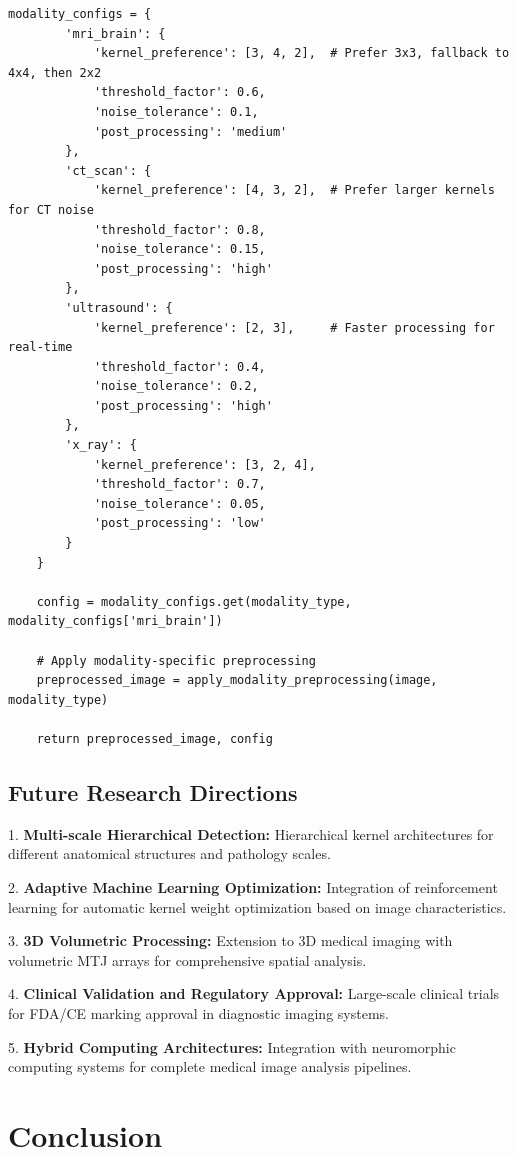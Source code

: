 \documentclass[conference]{IEEEtran}
\begin{document}
{{{{{{{{{{\begin{lstlisting}[caption={Multi-modal adaptation implementation}]
    modality_configs = {
        'mri_brain': {
            'kernel_preference': [3, 4, 2],  # Prefer 3x3, fallback to 4x4, then 2x2
            'threshold_factor': 0.6,
            'noise_tolerance': 0.1,
            'post_processing': 'medium'
        },
        'ct_scan': {
            'kernel_preference': [4, 3, 2],  # Prefer larger kernels for CT noise
            'threshold_factor': 0.8,
            'noise_tolerance': 0.15,
            'post_processing': 'high'
        },
        'ultrasound': {
            'kernel_preference': [2, 3],     # Faster processing for real-time
            'threshold_factor': 0.4,
            'noise_tolerance': 0.2,
            'post_processing': 'high'
        },
        'x_ray': {
            'kernel_preference': [3, 2, 4],
            'threshold_factor': 0.7,
            'noise_tolerance': 0.05,
            'post_processing': 'low'
        }
    }
    
    config = modality_configs.get(modality_type, modality_configs['mri_brain'])
    
    # Apply modality-specific preprocessing
    preprocessed_image = apply_modality_preprocessing(image, modality_type)
    
    return preprocessed_image, config
\end{lstlisting}

\subsection{Future Research Directions}

1. \textbf{Multi-scale Hierarchical Detection:} Hierarchical kernel architectures for different anatomical structures and pathology scales.

2. \textbf{Adaptive Machine Learning Optimization:} Integration of reinforcement learning for automatic kernel weight optimization based on image characteristics.

3. \textbf{3D Volumetric Processing:} Extension to 3D medical imaging with volumetric MTJ arrays for comprehensive spatial analysis.

4. \textbf{Clinical Validation and Regulatory Approval:} Large-scale clinical trials for FDA/CE marking approval in diagnostic imaging systems.

5. \textbf{Hybrid Computing Architectures:} Integration with neuromorphic computing systems for complete medical image analysis pipelines.

\section{Conclusion}

}}}}}}}}}}
\end{document}
